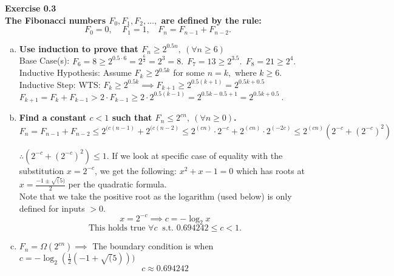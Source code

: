 \documentclass{article}
\newenvironment{problem}[2][Exercise]
    { \begin{mdframed}[backgroundcolor=gray!20] \textbf{#1 #2} \\}
    {  \end{mdframed}}
\renewcommand{\qed}{\quad\qedsymbol}
\begin{document}
\begin{problem}{0.3}
    \textbf{The Fibonacci numbers $F_0, F_1, F_2, \ldots,$ are defined by the rule:}
    \[
        F_0=0, \ \ \ \ \ 
        F_1=1, \ \ \ \ 
        F_n=F_{n-1}+F_{n-2}.
    \]

    \begin{enumerate}[(a)]
        \item \textbf{Use induction to prove that $F_n \geq 2^{0.5n}, \ (\forall n \geq 6)$}
        \\
        Base Case(s):
        $F_6 = 8 \geq 2^{0.5 \cdot 6} = 2^{\frac{6}{2}} = 2^3 = 8. \ \ F_7=13 \geq 2^{3.5}. \ \ F_8=21 \geq 2^4.$
        \\
        Inductive Hypothesis:
        Assume $F_k\geq2^{0.5k}$ for some $n=k,$ where $k\geq6$.
        \\
        Inductive Step:
        WTS: $F_k\geq2^{0.5k}
        \implies
        F_{k+1}\geq2^{0.5(k+1)}
        =2^{0.5k+0.5}$
        \\
        $F_{k+1}=F_{k}+F_{k-1}
        > 2\cdot F_{k-1}
        \geq 2\cdot 2^{0.5(k-1)}
        = 2^{0.5k-0.5+1} 
        = \boxed{2^{0.5k+0.5}} \ .$
        \qed
        
        \item \textbf{Find a constant $c < 1$ such that $F_n \leq 2^{cn}, \  (\forall n \geq 0)$.}
        \\
        $F_n = F_{n-1} + F_{n-2} 
        \leq 2^{(c(n-1)} + 2^{(c(n-2)} 
        \leq 2^{(cn)} \cdot 2^{-c} + 2^{(cn)} \cdot 2^{(-2c)} 
        \leq 2^{(cn)} (2^{-c} + (2^{-c})^2)$
        
        $\therefore (2^{-c} + (2^{-c})^2) \leq 1$. If we look at specific case of equality with the substitution $x=2^{-c}$, we get the following: $x^2 + x - 1 = 0$
        which has roots at $x = \frac{-1 \pm \sqrt(5)}{2}$ per the quadratic formula.
        \\
        Note that we take the positive root as the logarithm (used below) is only defined for inputs $>0$.
        \[
            x=2^{-c}
            \implies
            c = -\log_2 x
        \]
        \[
            \boxed{\text{This holds true }\forall c \ \text{ s.t. } 0.694242 \leq c < 1}.
        \]
        
        \item $F_n=\Omega(2^{cn})\implies$
        The boundary condition is when $c=-\log_2(\frac12 (-1 + \sqrt(5)))$
        \[
            \boxed{c \approx 0.694242}
        \]
    \end{enumerate}
\end{problem}
\end{document}
